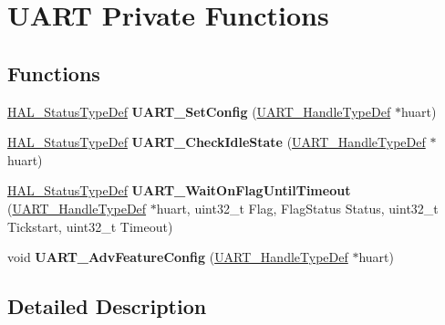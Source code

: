 \hypertarget{group___u_a_r_t___private___functions}{}\section{U\+A\+RT Private Functions}
\label{group___u_a_r_t___private___functions}
\subsection*{Functions}
\begin{DoxyCompactItemize}
\item 
\mbox{\label{group___u_a_r_t___private___functions_ga5a87d1b1c4284cae14f5a1402efaa11b}} 
\mbox{\hyperlink{stm32f7xx__hal__def_8h_a63c0679d1cb8b8c684fbb0632743478f}{H\+A\+L\+\_\+\+Status\+Type\+Def}} {\bfseries U\+A\+R\+T\+\_\+\+Set\+Config} (\mbox{\hyperlink{group___u_a_r_t___exported___types_ga7adf4f3e4c3ecde572be5925c915a967}{U\+A\+R\+T\+\_\+\+Handle\+Type\+Def}} $\ast$huart)
\item 
\mbox{\label{group___u_a_r_t___private___functions_gad945067db34d4e1c3bd27a14fa8d7d25}} 
\mbox{\hyperlink{stm32f7xx__hal__def_8h_a63c0679d1cb8b8c684fbb0632743478f}{H\+A\+L\+\_\+\+Status\+Type\+Def}} {\bfseries U\+A\+R\+T\+\_\+\+Check\+Idle\+State} (\mbox{\hyperlink{group___u_a_r_t___exported___types_ga7adf4f3e4c3ecde572be5925c915a967}{U\+A\+R\+T\+\_\+\+Handle\+Type\+Def}} $\ast$huart)
\item 
\mbox{\label{group___u_a_r_t___private___functions_gad377d340a4703ef434289d54794c281f}} 
\mbox{\hyperlink{stm32f7xx__hal__def_8h_a63c0679d1cb8b8c684fbb0632743478f}{H\+A\+L\+\_\+\+Status\+Type\+Def}} {\bfseries U\+A\+R\+T\+\_\+\+Wait\+On\+Flag\+Until\+Timeout} (\mbox{\hyperlink{group___u_a_r_t___exported___types_ga7adf4f3e4c3ecde572be5925c915a967}{U\+A\+R\+T\+\_\+\+Handle\+Type\+Def}} $\ast$huart, uint32\+\_\+t Flag, Flag\+Status Status, uint32\+\_\+t Tickstart, uint32\+\_\+t Timeout)
\item 
\mbox{\label{group___u_a_r_t___private___functions_gacd304011919c5ccd02544208c7aa451b}} 
void {\bfseries U\+A\+R\+T\+\_\+\+Adv\+Feature\+Config} (\mbox{\hyperlink{group___u_a_r_t___exported___types_ga7adf4f3e4c3ecde572be5925c915a967}{U\+A\+R\+T\+\_\+\+Handle\+Type\+Def}} $\ast$huart)
\end{DoxyCompactItemize}


\subsection{Detailed Description}
